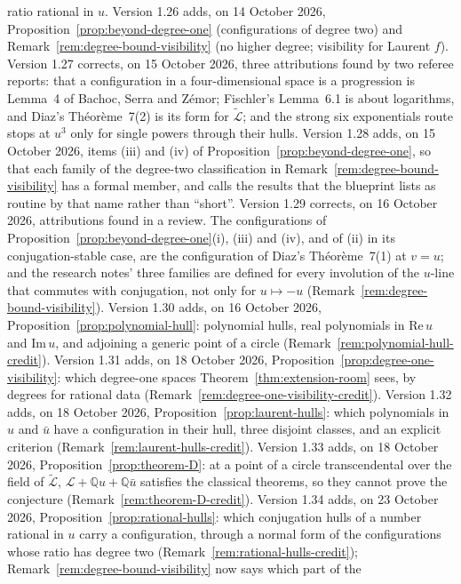 \documentclass[11pt,a4paper]{article}
\theoremstyle{plain}
\theoremstyle{definition}
\newcommand{\Q}{\mathbb{Q}}
\newcommand{\Logs}{\mathcal{L}}
\newcommand{\aLogs}{\widetilde{\mathcal{L}}}
\begin{document}
ratio rational in $u$.
Version 1.26 adds, on 14 October 2026, Proposition~\ref{prop:beyond-degree-one} (configurations of degree two)
and Remark~\ref{rem:degree-bound-visibility} (no higher degree; visibility for Laurent $f$).
Version 1.27 corrects, on 15 October 2026, three attributions found by two referee reports: that a configuration
in a four-dimensional space is a progression is Lemma~4 of Bachoc, Serra and Z\'emor; Fischler's
Lemma~6.1 is about logarithms, and Diaz's Th\'eor\`eme~7(2) is its form for $\aLogs$; and the strong six
exponentials route stops at $u^{3}$ only for single powers through their hulls.
Version 1.28 adds, on 15 October 2026, items (iii) and (iv) of Proposition~\ref{prop:beyond-degree-one}, so that each
family of the degree-two classification in Remark~\ref{rem:degree-bound-visibility} has a formal member, and
calls the results that the blueprint lists as routine by that name rather than ``short''.
Version 1.29 corrects, on 16 October 2026, attributions found in a review. The configurations of
Proposition~\ref{prop:beyond-degree-one}(i), (iii) and (iv), and of (ii) in its conjugation-stable case, are the
configuration of Diaz's Th\'eor\`eme~7(1) at $v=u$; and the research notes' three families are defined for every
involution of the $u$-line that commutes with conjugation, not only for $u\mapsto-u$
(Remark~\ref{rem:degree-bound-visibility}).
Version 1.30 adds, on 16 October 2026, Proposition~\ref{prop:polynomial-hull}: polynomial hulls, real polynomials in
$\mathrm{Re}\,u$ and $\mathrm{Im}\,u$, and adjoining a generic point of a circle
(Remark~\ref{rem:polynomial-hull-credit}).
Version 1.31 adds, on 18 October 2026, Proposition~\ref{prop:degree-one-visibility}: which degree-one spaces
Theorem~\ref{thm:extension-room} sees, by degrees for rational data (Remark~\ref{rem:degree-one-visibility-credit}).
Version 1.32 adds, on 18 October 2026, Proposition~\ref{prop:laurent-hulls}: which polynomials in $u$ and $\bar u$ have a
configuration in their hull, three disjoint classes, and an explicit criterion (Remark~\ref{rem:laurent-hulls-credit}).
Version 1.33 adds, on 18 October 2026, Proposition~\ref{prop:theorem-D}: at a point of a circle transcendental over the
field of $\aLogs$, $\Logs+\Q u+\Q\bar u$ satisfies the classical theorems, so they cannot prove the conjecture
(Remark~\ref{rem:theorem-D-credit}).
Version 1.34 adds, on 23 October 2026, Proposition~\ref{prop:rational-hulls}: which conjugation hulls of a number rational in
$u$ carry a configuration, through a normal form of the configurations whose ratio has degree two
(Remark~\ref{rem:rational-hulls-credit}); Remark~\ref{rem:degree-bound-visibility} now says which part of the
\end{document}
